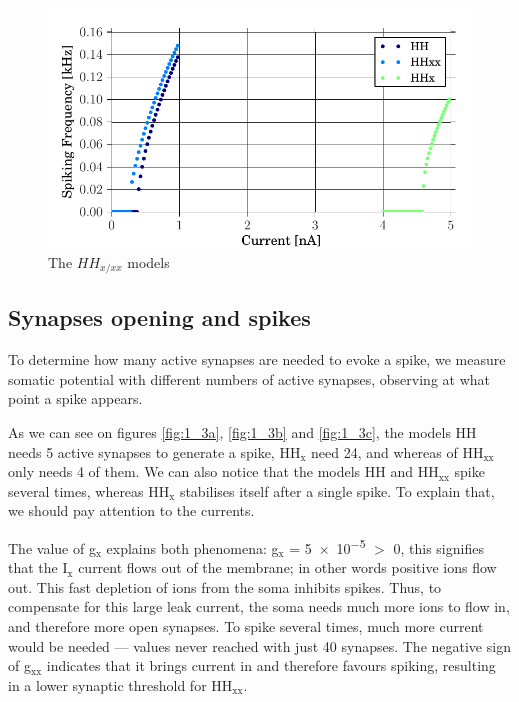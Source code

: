 \documentclass[a4paper, 10pt, conference]{ieeeconf}      %
\begin{document}
\begin{figure}
\includegraphics[width=\columnwidth]{../figures/1_2-neuron_type.pdf}

\caption{The $HH_{x/xx}$ models}
\label{fig:1_2}
\end{figure}







\subsection{Synapses opening and spikes}
To determine how many active synapses are needed to evoke a spike, we measure somatic potential with different numbers of active synapses, observing at what point a spike appears. 

As we can see on figures \ref{fig:1_3a}, \ref{fig:1_3b} and \ref{fig:1_3c}, the models HH needs 5 active synapses to generate a spike, HH$_\text{x}$ need 24, and whereas of HH$_\text{xx}$ only needs 4 of them. We can also notice that the models HH and HH$_\text{xx}$ spike several times, whereas HH$_\text{x}$ stabilises itself after a single spike. To explain that, we should pay attention to the currents. 

The value of g$_\text{x}$ explains both phenomena: g$_\text{x}$ = \num{5e-5} $>$ 0, this signifies that the I$_\text{x}$ current flows out of the membrane; in other words positive ions flow out. This fast depletion of ions from the soma inhibits spikes. Thus, to compensate for this large leak current, the soma needs much more ions to flow in, and therefore more open synapses. To spike several times, much more current would be needed --- values never reached with just 40 synapses. The negative sign of g$_\text{xx}$ indicates that it brings current in and therefore favours spiking, resulting in a lower synaptic threshold for HH$_\text{xx}$. 
\end{document}
